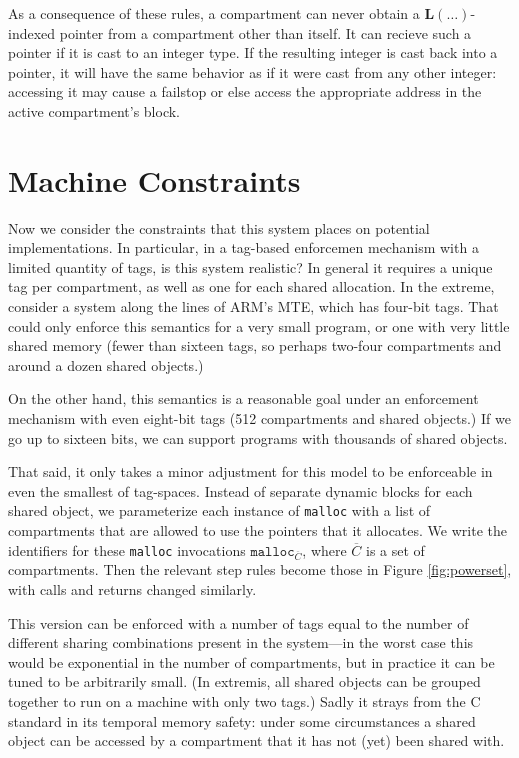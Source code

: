 \documentclass{article}
\begin{document}
As a consequence of these rules, a compartment can never obtain a
\(\mathbf{L}(\dots)\)-indexed pointer from a compartment other than itself.
It can recieve such a pointer if it is cast to an integer type. If the resulting
integer is cast back into a pointer, it will have the same behavior as if it were cast
from any other integer: accessing it may cause a failstop or else access the
appropriate address in the active compartment's block.

\section{Machine Constraints}

Now we consider the constraints that this system places on potential implementations.
In particular, in a tag-based enforcemen mechanism with a limited quantity of tags,
is this system realistic? In general it requires a unique tag per compartment,
as well as one for each shared allocation. In the extreme, consider a system along
the lines of ARM's MTE, which has four-bit tags. That could only enforce this
semantics for a very small program, or one with very little shared memory (fewer than sixteen tags, so perhaps two-four compartments and around a dozen shared objects.)

On the other hand, this semantics is a reasonable goal under an enforcement mechanism
with even eight-bit tags (512 compartments and shared objects.) If we go up to sixteen
bits, we can support programs with thousands of shared objects.

That said, it only takes a minor adjustment for this model to be enforceable in even
the smallest of tag-spaces. Instead of separate dynamic blocks for each shared
object, we parameterize each instance of {\tt malloc} with a list of compartments
that are allowed to use the pointers that it allocates. We write the identifiers
for these {\tt malloc} invocations \(\mathtt{malloc}_{\overline{C}}\), where
\(\overline{C}\) is a set of compartments. Then the relevant step rules become
those in Figure \ref{fig:powerset}, with calls and returns changed similarly.

This version can be enforced with a number of tags equal to the number of different
sharing combinations present in the system---in the worst case this would be
exponential in the number of compartments, but in practice it can be tuned to be
arbitrarily small. (In extremis, all shared objects can be grouped together to run
on a machine with only two tags.) Sadly it strays from the C standard in its
temporal memory safety: under some circumstances a shared object can be accessed
by a compartment that it has not (yet) been shared with.
\end{document}
